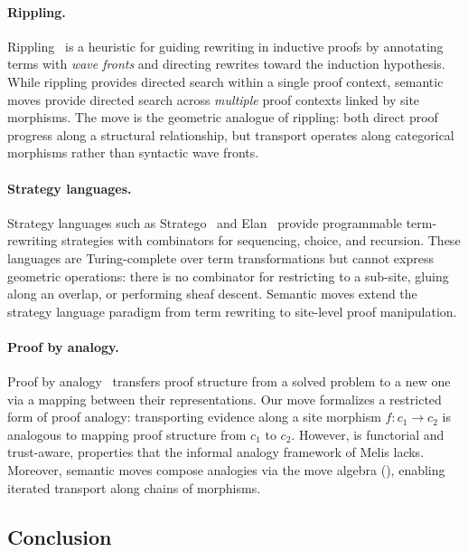 \documentclass[11pt]{article}
\begin{document}
\paragraph{Rippling.}
Rippling~\cite{Bundy2005Rippling} is a heuristic for
guiding rewriting in inductive proofs by annotating terms
with \emph{wave fronts} and directing rewrites toward
the induction hypothesis.  While rippling provides directed
search within a single proof context, semantic moves provide
directed search across \emph{multiple} proof contexts linked
by site morphisms.  The \TRANSPORT{} move is the geometric
analogue of rippling: both direct proof progress along a
structural relationship, but transport operates along
categorical morphisms rather than syntactic wave fronts.

\paragraph{Strategy languages.}
Strategy languages such as Stratego~\cite{Visser2004Stratego}
and Elan~\cite{Borovansky1998Elan} provide programmable
term-rewriting strategies with combinators for sequencing,
choice, and recursion.  These languages are Turing-complete
over term transformations but cannot express geometric
operations: there is no combinator for restricting to a
sub-site, gluing along an overlap, or performing sheaf
descent.  Semantic moves extend the strategy language paradigm
from term rewriting to site-level proof manipulation.

\paragraph{Proof by analogy.}
Proof by analogy~\cite{Melis1999ProofAnalogy} transfers proof
structure from a solved problem to a new one via a mapping
between their representations.  Our \TRANSPORT{} move
formalizes a restricted form of proof analogy: transporting
evidence along a site morphism $f: c_1 \to c_2$ is analogous
to mapping proof structure from $c_1$ to $c_2$.  However,
\TRANSPORT{} is functorial and trust-aware, properties that
the informal analogy framework of Melis lacks.  Moreover,
semantic moves compose analogies via the move algebra
(), enabling iterated transport
along chains of morphisms.

\subsection{Conclusion}
\end{document}
